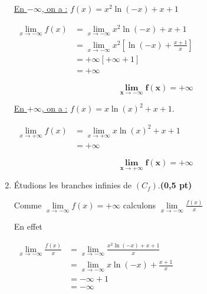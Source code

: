 \documentclass[12pt,a4paper]{article}
\begin{document}
\begin{enumerate}
          \underline{En \( -\infty \), on a :} \( f(x) = x^2 \ln(-x) + x + 1 \)

          \(
          \begin{aligned}
              \lim\limits_{x\to -\infty} f(x) & = \lim\limits_{x\to -\infty} x^2 \ln(-x) + x + 1                          \\
                                              & = \lim\limits_{x\to -\infty} x^{2} \left[\ln(-x) + \frac{x + 1}{x}\right] \\
                                              & = +\infty \left[+\infty+1 \right]                                         \\
                                              & =+\infty
          \end{aligned}
          \)

          \begin{resultbox}
              \[
                  \mathbf{\lim\limits_{x\to -\infty} f(x) = +\infty }
              \]
          \end{resultbox}

          \underline{En \( +\infty \), on a :} \( f(x) = x \ln(x)^2 + x + 1. \)

          \(
          \begin{aligned}
              \lim\limits_{x\to +\infty} f(x) & = \lim\limits_{x\to +\infty}  x \ln(x)^2 + x + 1 \\
                                              & =+\infty
          \end{aligned}
          \)

          \begin{resultbox}
              \[
                  \mathbf{\lim\limits_{x\to +\infty} f(x) = +\infty }
              \]
          \end{resultbox}

    \item Étudions les branches infinies de \( (C_f) \).\hfill \textbf{(0,5 pt)}

          Comme \( \lim\limits_{x\to -\infty} f(x) = +\infty  \) calculons \( \lim\limits_{x\to -\infty} \frac{f(x)}{x}   \)

          En effet

          \(
          \begin{aligned}
              \lim\limits_{x\to -\infty} \frac{f(x)}{x} & = \lim\limits_{x\to -\infty} \frac{x^2 \ln(-x) + x + 1}{x} \\
                                                        & =\lim\limits_{x\to -\infty} x\ln(-x) + \frac{x + 1}{x}     \\
                                                        & =-\infty+1                                                 \\
                                                        & =-\infty
          \end{aligned}
          \)


\end{enumerate}
\end{document}
